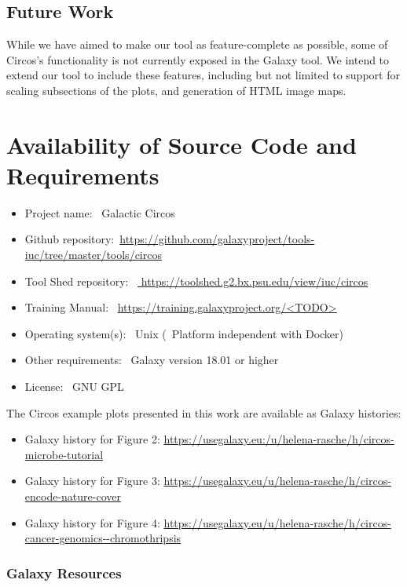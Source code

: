 \subsection*{Future Work}
While we have aimed to make our tool as feature-complete as possible, some of Circos's functionality is not currently exposed in the Galaxy tool. We intend to extend our tool to include these features, including but not limited to support for scaling subsections of the plots, and generation of HTML image maps.

\section*{Availability of Source Code and Requirements}
\begin{itemize}
\item Project name: ~Galactic Circos
\item Github repository:~\url{https://github.com/galaxyproject/tools-iuc/tree/master/tools/circos}
\item Tool Shed repository: ~\url{ https://toolshed.g2.bx.psu.edu/view/iuc/circos}
\item Training Manual: ~\url{https://training.galaxyproject.org/<TODO>}
\item Operating system(s): ~Unix (~Platform independent with Docker)
\item Other requirements: ~Galaxy version 18.01 or higher
\item License: ~GNU GPL
\end{itemize}

The Circos example plots presented in this work are available as Galaxy histories:

\begin{itemize}
\item Galaxy history for Figure 2: \url{https://usegalaxy.eu:/u/helena-rasche/h/circos-microbe-tutorial}
\item Galaxy history for Figure 3: \url{https://usegalaxy.eu/u/helena-rasche/h/circos-encode-nature-cover}
\item Galaxy history for Figure 4: \url{https://usegalaxy.eu/u/helena-rasche/h/circos-cancer-genomics--chromothripsis}
\end{itemize}

\subsubsection*{Galaxy Resources}

